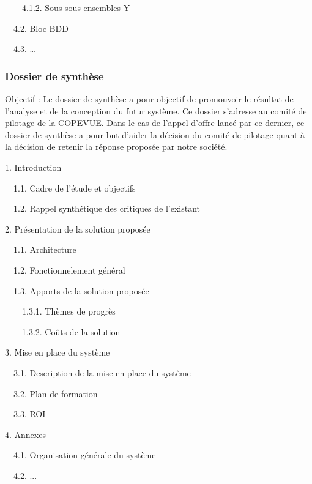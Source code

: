 \documentclass{mise_en_page}
\begin{document}
\ \ \ \ 4.1.2. Sous-sous-ensembles Y

\ \ 4.2. Bloc BDD

\ \ 4.3. …




\subsubsection{Dossier de synthèse}
Objectif : Le dossier de synthèse a pour objectif de promouvoir le
résultat de l’analyse et de la conception du futur système. Ce dossier
s’adresse au comité de pilotage de la COPEVUE. Dans le cas de l’appel
d’offre lancé par ce dernier, ce dossier de synthèse a pour but d’aider
la décision du comité de pilotage quant à la décision de retenir la
réponse proposée par notre société.

1. Introduction

\ \ 1.1. Cadre de l’étude et objectifs

\ \ 1.2. Rappel synthétique des critiques de l’existant

2. Présentation de la solution proposée

\ \ 1.1. Architecture

\ \ 1.2. Fonctionnelement général

\ \ 1.3. Apports de la solution proposée

\ \ \ \ 1.3.1. Thèmes de progrès

\ \ \ \ 1.3.2. Coûts de la solution

3. Mise en place du système

\ \ 3.1. Description de la mise en place du système

\ \ 3.2. Plan de formation

\ \ 3.3. ROI

4. Annexes

\ \ 4.1. Organisation générale du système

\ \ 4.2. ...
\end{document}
